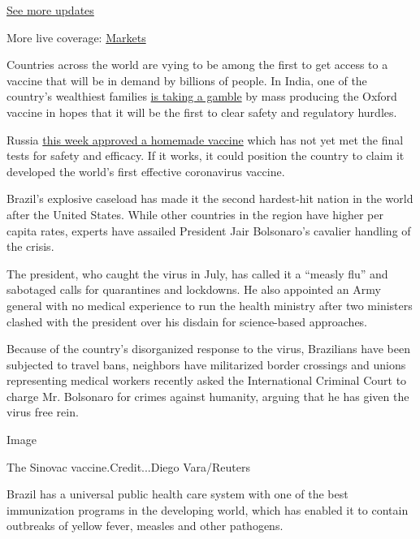 \href{https://www.nytimes3xbfgragh.onion/2020/08/20/world/coronavirus-covid.html?action=click\&pgtype=Article\&state=default\&region=MAIN_CONTENT_1\&context=storylines_live_updates}{See
more updates}

More live coverage:
\href{https://www.nytimes3xbfgragh.onion/live/2020/08/20/business/stock-market-today-coronavirus?action=click\&pgtype=Article\&state=default\&region=MAIN_CONTENT_1\&context=storylines_live_updates}{Markets}

Countries across the world are vying to be among the first to get access
to a vaccine that will be in demand by billions of people. In India, one
of the country's wealthiest families
\href{https://www.nytimes3xbfgragh.onion/2020/08/01/world/asia/coronavirus-vaccine-india.html}{is
taking a gamble} by mass producing the Oxford vaccine in hopes that it
will be the first to clear safety and regulatory hurdles.

Russia
\href{https://www.nytimes3xbfgragh.onion/2020/08/11/world/europe/russia-coronavirus-vaccine-approval.html}{this
week approved a homemade vaccine} which has not yet met the final tests
for safety and efficacy. If it works, it could position the country to
claim it developed the world's first effective coronavirus vaccine.

Brazil's explosive caseload has made it the second hardest-hit nation in
the world after the United States. While other countries in the region
have higher per capita rates, experts have assailed President Jair
Bolsonaro's cavalier handling of the crisis.

The president, who caught the virus in July, has called it a ``measly
flu'' and sabotaged calls for quarantines and lockdowns. He also
appointed an Army general with no medical experience to run the health
ministry after two ministers clashed with the president over his disdain
for science-based approaches.

Because of the country's disorganized response to the virus, Brazilians
have been subjected to travel bans, neighbors have militarized border
crossings and unions representing medical workers recently asked the
International Criminal Court to charge Mr. Bolsonaro for crimes against
humanity, arguing that he has given the virus free rein.

Image

The Sinovac vaccine.Credit...Diego Vara/Reuters

Brazil has a universal public health care system with one of the best
immunization programs in the developing world, which has enabled it to
contain outbreaks of yellow fever, measles and other pathogens.

